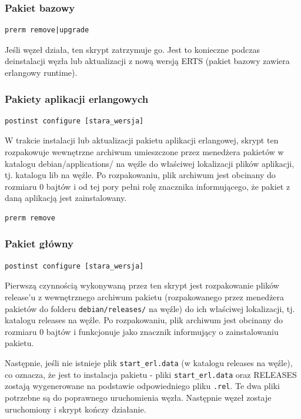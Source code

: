 \documentclass[polish,12pt]{aghthesis}
\begin{document}
\subsubsection{Pakiet bazowy}
\begin{verbatim}
prerm remove|upgrade
\end{verbatim}
Jeśli węzeł działa, ten skrypt zatrzymuje go. Jest to konieczne podczas deinstalacji węzła lub aktualizacji z nową wersją ERTS (pakiet bazowy zawiera erlangowy runtime).

\subsubsection{Pakiety aplikacji erlangowych}
\begin{verbatim}
postinst configure [stara_wersja]
\end{verbatim}

W trakcie instalacji lub aktualizacji pakietu aplikacji erlangowej, skrypt ten rozpakowuje wewnętrzne archiwum umieszczone przez menedżera pakietów w katalogu debian/applications/ na węźle do właściwej lokalizacji plików aplikacji, tj. katalogu lib na węźle. Po rozpakowaniu, plik archiwum jest obcinany do rozmiaru 0 bajtów i od tej pory pełni rolę znacznika informującego, że pakiet z daną aplikacją jest zainstalowany.

\begin{verbatim}
prerm remove
\end{verbatim}

\subsubsection{Pakiet główny}

\begin{verbatim}
postinst configure [stara_wersja]
\end{verbatim}

Pierwszą czynnością wykonywaną przez ten skrypt jest rozpakowanie plików release'u z wewnętrznego archiwum pakietu (rozpakowanego przez menedżera pakietów do folderu \texttt{debian/releases/} na węźle) do ich właściwej lokalizacji, tj. katalogu releases na węźle. Po rozpakowaniu, plik archiwum jest obcinany do rozmiaru 0 bajtów i funkcjonuje jako znacznik informujący o zainstalowaniu pakietu.

Następnie, jeśli nie istnieje plik \texttt{start\_erl.data} (w katalogu releases na węźle), co oznacza, że jest to instalacja pakietu - pliki \texttt{start\_erl.data} oraz RELEASES zostają wygenerowane na podstawie odpowiedniego pliku \texttt{.rel}. Te dwa pliki potrzebne są do poprawnego uruchomienia węzła. Następnie węzeł zostaje uruchomiony i skrypt kończy działanie.
\end{document}
